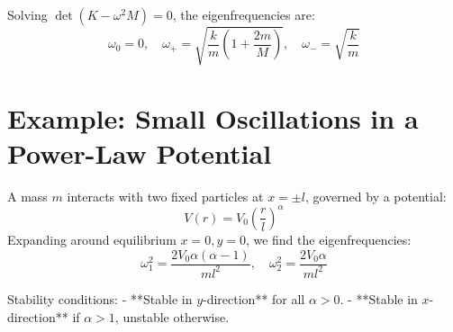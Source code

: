 \documentclass{article}
\begin{document}
Solving \( \det(K - \omega^2 M) = 0 \), the eigenfrequencies are:
\begin{equation}
\omega_0 = 0, \quad \omega_+ = \sqrt{\frac{k}{m} \left(1 + \frac{2m}{M} \right)}, \quad \omega_- = \sqrt{\frac{k}{m}}
\end{equation}

\section{Example: Small Oscillations in a Power-Law Potential}
A mass \( m \) interacts with two fixed particles at \( x = \pm l \), governed by a potential:
\begin{equation}
V(r) = V_0 \left(\frac{r}{l}\right)^\alpha
\end{equation}
Expanding around equilibrium \( x = 0, y = 0 \), we find the eigenfrequencies:
\begin{equation}
\omega_1^2 = \frac{2V_0\alpha(\alpha - 1)}{ml^2}, \quad \omega_2^2 = \frac{2V_0\alpha}{ml^2}
\end{equation}

Stability conditions:
- **Stable in \( y \)-direction** for all \( \alpha > 0 \).
- **Stable in \( x \)-direction** if \( \alpha > 1 \), unstable otherwise.
\end{document}
